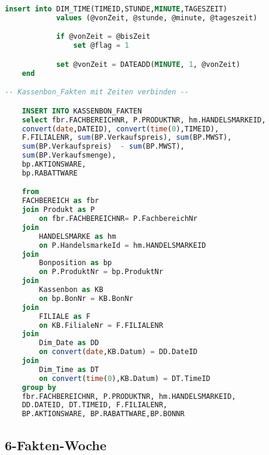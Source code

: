 \begin{lstlisting}[language=SQL]
		insert into DIM_TIME(TIMEID,STUNDE,MINUTE,TAGESZEIT)
			values (@vonZeit, @stunde, @minute, @tageszeit)

			if @vonZeit = @bisZeit
				set @flag = 1

			set @vonZeit = DATEADD(MINUTE, 1, @vonZeit)
	end

-- Kassenbon_Fakten mit Zeiten verbinden --

	INSERT INTO KASSENBON_FAKTEN
	select fbr.FACHBEREICHNR, P.PRODUKTNR, hm.HANDELSMARKEID,
	convert(date,DATEID), convert(time(0),TIMEID),
    F.FILIALENR, sum(BP.Verkaufspreis), sum(BP.MWST),
	sum(BP.Verkaufspreis)  - sum(BP.MWST),
	sum(BP.Verkaufsmenge),
	bp.AKTIONSWARE,
	bp.RABATTWARE

	from
	FACHBEREICH as fbr
	join Produkt as P
		on fbr.FACHBEREICHNR= P.FachbereichNr
	join
		HANDELSMARKE as hm
		on P.HandelsmarkeId = hm.HANDELSMARKEID
	join
		Bonposition as bp
		on P.ProduktNr = bp.ProduktNr
	join
		Kassenbon as KB
		on bp.BonNr = KB.BonNr
	join
		FILIALE as F
		on KB.FilialeNr = F.FILIALENR
	join
		Dim_Date as DD
		on convert(date,KB.Datum) = DD.DateID
	join
		Dim_Time as DT
		on convert(time(0),KB.Datum) = DT.TimeID
	group by
	fbr.FACHBEREICHNR, P.PRODUKTNR, hm.HANDELSMARKEID,
	DD.DATEID, DT.TIMEID, F.FILIALENR,
	BP.AKTIONSWARE, BP.RABATTWARE,BP.BONNR

\end{lstlisting}

\subsection{6-Fakten-Woche}


